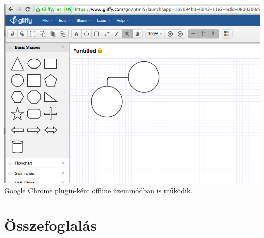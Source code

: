 \includegraphics[width=160mm,keepaspectratio]{figures/gliffy.png}\\


Google Chrome plugin-ként offline üzemmódban is működik.


\section{Összefoglalás}


